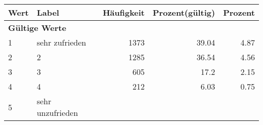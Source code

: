      \begin{longtable}{lXrrr}
     \toprule
     \textbf{Wert} & \textbf{Label} & \textbf{Häufigkeit} & \textbf{Prozent(gültig)} & \textbf{Prozent} \\
     \endhead
     \midrule
     \multicolumn{5}{l}{\textbf{Gültige Werte}}\\

     1 &
     \multicolumn{1}{X}{ sehr zufrieden   } &


       \num{1373} &
       \num[round-mode=places,round-precision=2]{39.04} &
         \num[round-mode=places,round-precision=2]{4.87} \\

     2 &
     \multicolumn{1}{X}{ 2   } &


       \num{1285} &
       \num[round-mode=places,round-precision=2]{36.54} &
         \num[round-mode=places,round-precision=2]{4.56} \\

     3 &
     \multicolumn{1}{X}{ 3   } &


       \num{605} &
       \num[round-mode=places,round-precision=2]{17.2} &
         \num[round-mode=places,round-precision=2]{2.15} \\

     4 &
     \multicolumn{1}{X}{ 4   } &


       \num{212} &
       \num[round-mode=places,round-precision=2]{6.03} &
         \num[round-mode=places,round-precision=2]{0.75} \\

     5 &
     \multicolumn{1}{X}{ sehr unzufrieden   } &



\end{longtable}
